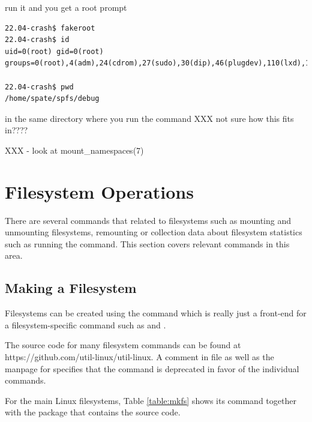 run it and you get a root prompt

\begin{lstlisting}
22.04-crash$ fakeroot
22.04-crash$ id
uid=0(root) gid=0(root) groups=0(root),4(adm),24(cdrom),27(sudo),30(dip),46(plugdev),110(lxd),1000(spate)

22.04-crash$ pwd
/home/spate/spfs/debug
\end{lstlisting}

in the same directory where you run the command XXX not sure how this fits in????

XXX - look at  mount\_namespaces(7)


\section{Filesystem Operations}

There are several commands that related to filesystems such as mounting and unmounting filesystems, remounting or collection data about filesystem statistics such as running the  command. This section covers relevant commands in this area.


\subsection{Making a Filesystem}

Filesystems can be created using the  command which is really just a front-end for a filesystem-specific  command such as  and .

The source code for many filesystem commands can be found at https://github.com/util-linux/util-linux. A comment in  file as well as the manpage for  specifies that the command is deprecated in favor of the individual commands. 

For the main Linux filesystems, Table \ref{table:mkfs} shows its  command together with the package that contains the source code. 

